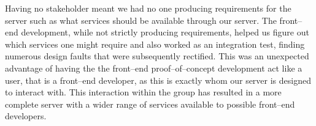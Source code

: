 Having no stakeholder meant we had no one producing requirements for the server such as what services should be available through our server.
The front--end development, while not strictly producing requirements, helped us figure out which services one might require and also worked as an integration test, finding numerous design faults that were subsequently rectified.
This was an unexpected advantage of having the the front--end proof--of--concept development act like a user, that is a front--end developer, as this is exactly whom our server is designed to interact with.
This interaction within the group has resulted in a more complete server with a wider range of services available to possible front--end developers.

